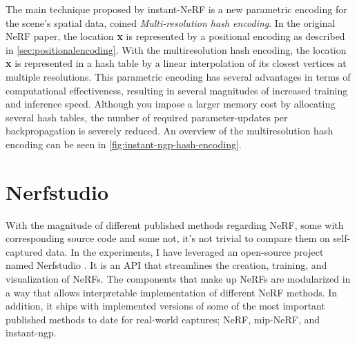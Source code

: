 The main technique proposed by instant-NeRF is a new parametric encoding for the scene's spatial data, coined \textit{Multi-resolution hash encoding}. In the original NeRF paper, the location \textbf{x} is represented by a positional encoding as described in \autoref{sec:positionalencoding}. With the multiresolution hash encoding, the location \textbf{x} is represented in a hash table by a linear interpolation of its closest vertices at multiple resolutions. This parametric encoding has several advantages in terms of computational effectiveness, resulting in several magnitudes of increased training and inference speed. Although you impose a larger memory cost by allocating several hash tables, the number of required parameter-updates per backpropagation is severely reduced. An overview of the multiresolution hash encoding can be seen in \autoref{fig:instant-ngp-hash-encoding}.





\section{Nerfstudio}
With the magnitude of different published methods regarding NeRF, some with corresponding source code and some not, it's not trivial to compare them on self-captured data. In the experiments, I have leveraged an open-source project named Nerfstudio \cite{nerfstudio}. It is an API that streamlines the creation, training, and visualization of NeRFs. The components that make up NeRFs are modularized in a way that allows interpretable implementation of different NeRF methods. In addition, it ships with implemented versions of some of the most important published methods to date for real-world captures; NeRF, mip-NeRF, and instant-ngp.


